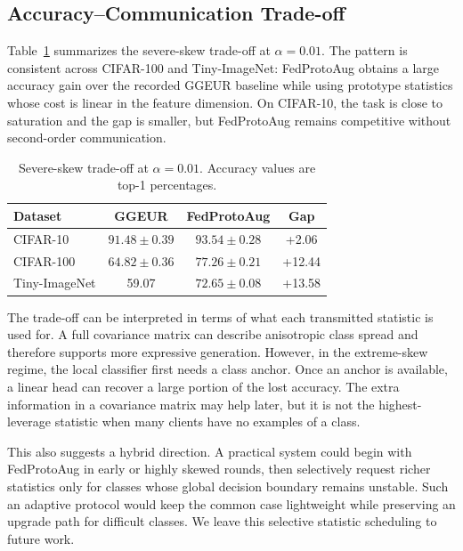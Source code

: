 ﻿\documentclass[conference]{IEEEtran}
\newcommand{\method}{FedProtoAug}
\begin{document}
\subsection{Accuracy--Communication Trade-off}
Table~\ref{tab:tradeoff} summarizes the severe-skew trade-off at $\alpha = 0.01$. The pattern is consistent across CIFAR-100 and Tiny-ImageNet: \method{} obtains a large accuracy gain over the recorded GGEUR baseline while using prototype statistics whose cost is linear in the feature dimension. On CIFAR-10, the task is close to saturation and the gap is smaller, but \method{} remains competitive without second-order communication.

\begin{table}[t]
\centering
\caption{Severe-skew trade-off at $\alpha = 0.01$. Accuracy values are top-1 percentages.}
\label{tab:tradeoff}
\begin{tabular}{lccc}
\toprule
Dataset & GGEUR & \method{} & Gap \\
\midrule
CIFAR-10 & $91.48\pm0.39$ & $93.54\pm0.28$ & +2.06 \\
CIFAR-100 & $64.82\pm0.36$ & $77.26\pm0.21$ & +12.44 \\
Tiny-ImageNet & 59.07 & $72.65\pm0.08$ & +13.58 \\
\bottomrule
\end{tabular}
\end{table}

The trade-off can be interpreted in terms of what each transmitted statistic is used for. A full covariance matrix can describe anisotropic class spread and therefore supports more expressive generation. However, in the extreme-skew regime, the local classifier first needs a class anchor. Once an anchor is available, a linear head can recover a large portion of the lost accuracy. The extra information in a covariance matrix may help later, but it is not the highest-leverage statistic when many clients have no examples of a class.

This also suggests a hybrid direction. A practical system could begin with \method{} in early or highly skewed rounds, then selectively request richer statistics only for classes whose global decision boundary remains unstable. Such an adaptive protocol would keep the common case lightweight while preserving an upgrade path for difficult classes. We leave this selective statistic scheduling to future work.
\end{document}
